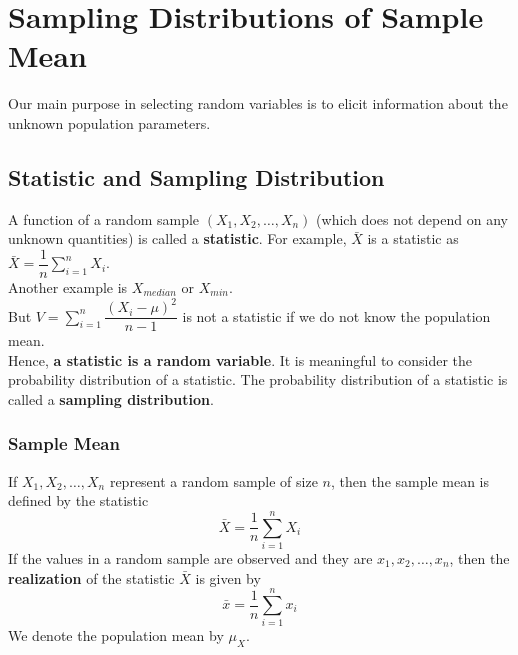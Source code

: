 \section{Sampling Distributions of Sample Mean}
Our main purpose in selecting random variables is to elicit information about the unknown population parameters.

\subsection{Statistic and Sampling Distribution}
A function of a random sample $(X_1, X_2, \dots, X_n)$ (which does not depend on any unknown quantities) is called a \textbf{statistic}. For example, $\bar{X}$ is a statistic as $\bar{X} = \dfrac{1}{n} \sum_{i = 1}^n X_i$. \\
Another example is $X_{median}$ or $X_{min}$. \\
But $V = \sum_{i = 1}^n \dfrac{(X_i - \mu)^2}{n - 1}$ is not a statistic if we do not know the population mean.\\
Hence, \textbf{a statistic is a random variable}. It is meaningful to consider the probability distribution of a statistic. The probability distribution of a statistic is called a \textbf{sampling distribution}.
\subsubsection{Sample Mean}
If $X_1, X_2, \dots, X_n$ represent a random sample of size $n$, then the sample mean is defined by the statistic
$$
\bar{X} = \dfrac{1}{n} \sum_{i = 1}^n X_i
$$
If the values in a random sample are observed and they are $x_1, x_2, \dots, x_n$, then the \textbf{realization} of the statistic $\bar{X}$ is given by 
$$\bar{x} = \dfrac{1}{n} \sum_{i = 1}^{n} x_i$$
We denote the population mean by $\mu_X$.


